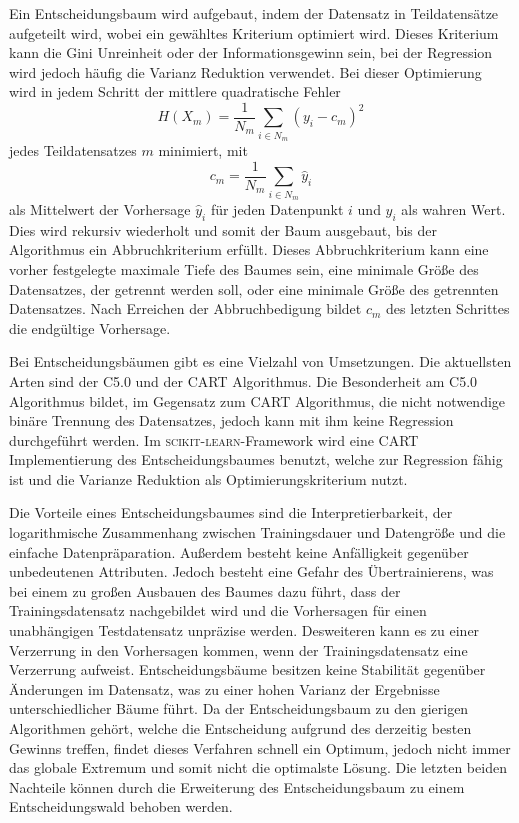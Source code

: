 Ein Entscheidungsbaum wird aufgebaut, indem der Datensatz in Teildatensätze aufgeteilt wird, wobei ein gewähltes Kriterium optimiert wird.
Dieses Kriterium
kann die Gini Unreinheit oder der Informationsgewinn sein, bei der Regression wird jedoch häufig die Varianz Reduktion verwendet.
Bei dieser Optimierung wird in jedem Schritt der mittlere quadratische Fehler
\begin{equation}
  H(X_m) = \frac{1}{N_m}\sum_{i\in N_m}(y_i-c_m)^2
\end{equation}
jedes Teildatensatzes $m$ minimiert, mit
\begin{equation}
  c_m = \frac{1}{N_m}\sum_{i\in N_m}\hat{y}_i
\end{equation}
als Mittelwert der Vorhersage $\hat{y}_i$ für jeden Datenpunkt $i$ und $y_i$ als wahren Wert.
Dies wird rekursiv wiederholt und somit der Baum ausgebaut, bis der Algorithmus ein Abbruchkriterium erfüllt.
Dieses Abbruchkriterium kann eine vorher festgelegte maximale Tiefe
des Baumes sein, eine minimale Größe des Datensatzes, der getrennt werden soll, oder eine minimale Größe des getrennten Datensatzes. Nach Erreichen der Abbruchbedigung bildet
$c_m$ des letzten Schrittes die endgültige Vorhersage.

Bei Entscheidungsbäumen gibt es eine Vielzahl von Umsetzungen.
Die aktuellsten Arten sind der C5.0 und der CART Algorithmus\cite[1]{CART}.
Die Besonderheit am C5.0 Algorithmus bildet, im Gegensatz zum CART Algorithmus, die nicht notwendige binäre Trennung des Datensatzes,
jedoch kann mit ihm keine Regression durchgeführt werden.
Im \textsc{scikit-learn}-Framework\cite{scikit-learn} wird eine CART Implementierung des Entscheidungsbaumes benutzt, welche zur
Regression fähig ist und die Varianze Reduktion als Optimierungskriterium nutzt.

Die Vorteile eines Entscheidungsbaumes sind die Interpretierbarkeit, der logarithmische Zusammenhang zwischen Trainingsdauer und Datengröße und die einfache Datenpräparation.
Außerdem besteht keine Anfälligkeit gegenüber unbedeutenen Attributen.
Jedoch besteht eine Gefahr des Übertrainierens, was bei einem zu großen Ausbauen des Baumes dazu führt, dass der Trainingsdatensatz nachgebildet
wird und die Vorhersagen für einen unabhängigen Testdatensatz unpräzise werden.
Desweiteren kann es zu einer Verzerrung in den Vorhersagen kommen, wenn der Trainingsdatensatz eine Verzerrung aufweist.
Entscheidungsbäume besitzen keine Stabilität gegenüber Änderungen im Datensatz, was zu einer hohen Varianz der Ergebnisse
unterschiedlicher Bäume führt.
Da der Entscheidungsbaum zu den gierigen Algorithmen gehört, welche die Entscheidung aufgrund des derzeitig besten Gewinns treffen, findet dieses Verfahren schnell ein
Optimum, jedoch nicht immer das globale Extremum und somit nicht die optimalste Lösung.
Die letzten beiden Nachteile können durch die Erweiterung des Entscheidungsbaum zu einem Entscheidungswald behoben werden.

